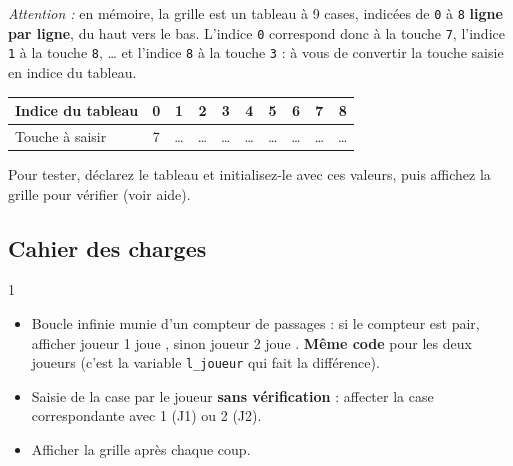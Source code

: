 \begin{center}
\end{center}

\textit{Attention :} en mémoire, la grille est un tableau à 9 cases, indicées de \texttt{0} à \texttt{8} \textbf{ligne par ligne}, du haut vers le bas. L'indice \texttt{0} correspond donc à la touche \texttt{7}, l'indice \texttt{1} à la touche \texttt{8}, \dots{} et l'indice \texttt{8} à la touche \texttt{3} : à vous de convertir la touche saisie en indice du tableau.

\begin{center}
\begin{tabular}{|l|*{9}{c|}}
\hline
Indice du tableau & 0 & 1 & 2 & 3 & 4 & 5 & 6 & 7 & 8 \\ \hline
Touche à saisir   & 7 & \dots & \dots & \dots & \dots & \dots & \dots & \dots & \dots \\ \hline
\end{tabular}
\end{center}

Pour tester, déclarez le tableau et initialisez-le avec ces valeurs, puis affichez la grille pour vérifier (voir aide).

\subsection*{Cahier des charges}
\begin{UPSTICahierDesCharges}{1}
\begin{itemize}
  \item Boucle infinie munie d'un compteur de passages : si le compteur est pair, afficher \og joueur 1 joue \fg{}, sinon \og joueur 2 joue \fg{}. \textbf{Même code} pour les deux joueurs (c'est la variable \texttt{l\_joueur} qui fait la différence).
  \item Saisie de la case par le joueur \textbf{sans vérification} : affecter la case correspondante avec 1 (J1) ou 2 (J2).
  \item Afficher la grille après chaque coup.
\end{itemize}
\end{UPSTICahierDesCharges}

